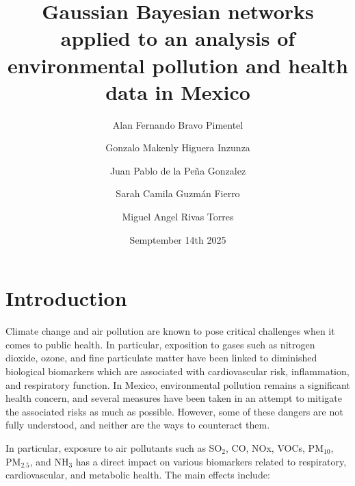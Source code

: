 \documentclass[twocolumn]{article}
\title{Gaussian Bayesian networks applied to an analysis of environmental pollution and health data in Mexico }
\author{
Alan Fernando Bravo Pimentel \and
Gonzalo Makenly Higuera Inzunza \and
Juan Pablo de la Peña Gonzalez \and
Sarah Camila Guzmán Fierro \and
Miguel Angel Rivas Torres
}
\date{Semptember 14th 2025}
\begin{document}
\maketitle

\begin{abstract}
\end{abstract}

\section{Introduction}
Climate change and air pollution are known to pose critical challenges when it comes to public health. In particular, exposition to gases such as nitrogen dioxide, ozone, and fine particulate matter have been linked to diminished biological biomarkers which are associated with cardiovascular risk, inflammation, and respiratory function. In Mexico, environmental pollution remains a significant health concern, and several measures have been taken in an attempt to mitigate the associated risks as much as possible. However, some of these dangers are not fully understood, and neither are the ways to counteract them.

\vspace{0.5cm}

In particular, exposure to air pollutants such as SO$_2$, CO, NOx, VOCs, PM$_{10}$, PM$_{2.5}$, and NH$_3$ has a direct impact on various biomarkers related to respiratory, cardiovascular, and metabolic health. The main effects include:
\end{document}
